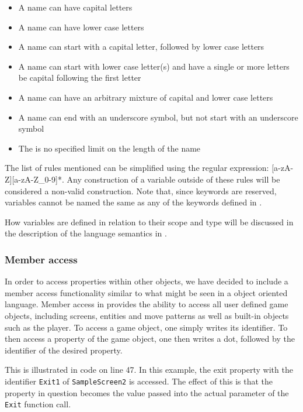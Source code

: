 \begin{itemize}
    \item A name can have capital letters
    \item A name can have lower case letters
    \item A name can start with a capital letter, followed by lower case letters
    \item A name can start with lower case letter(s) and have a single or more letters be capital following the first letter
    \item A name can have an arbitrary mixture of capital and lower case letters
    \item A name can end with an underscore symbol, but not start with an underscore symbol
    \item The is no specified limit on the length of the name
\end{itemize}

The list of rules mentioned can be simplified using the regular expression: [a-zA-Z][a-zA-Z\_0-9]*. Any construction of a variable outside of these rules will be considered
a non-valid construction. Note that, since keywords are reserved, variables cannot be named the same as any of the keywords defined in .

How variables are defined in relation to their scope and type will be discussed in the description of the language semantics in .

\subsubsection*{Member access}
In order to access properties within other objects, we have decided to include a member access functionality similar to what might be seen in a
object oriented language. Member access in \dazel{} provides the ability to access all user defined game objects, including screens, entities and move patterns as well
as built-in objects such as the player. To access a game object, one simply writes its identifier. To then access a property of the game object, one then writes
a dot, followed by the identifier of the desired property.

This is illustrated in code  on line 47. In this example, the exit property with the identifier \texttt{Exit1} of \texttt{SampleScreen2} is accessed.
The effect of this is that the property in question becomes the value passed into the actual parameter of the \texttt{Exit} function call.

